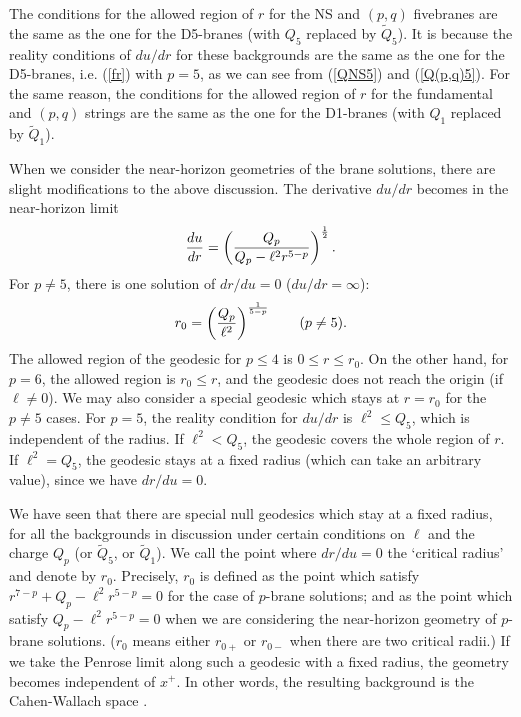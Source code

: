\documentclass[a4paper,12pt]{article}
\begin{document}
The conditions for the allowed region of $r$ for
the NS and $(p,q)$ fivebranes are the same as 
the one for the D5-branes (with $Q_5$ replaced
by $\tilde{Q}_{5}$). It is because the reality conditions
of $du/dr$ for these backgrounds
are the same as the one for the D5-branes,
i.e. (\ref{fr}) with $p=5$, as we can see from 
(\ref{QNS5}) and (\ref{Q(p,q)5}).
For the same reason, the conditions for the allowed
region of $r$ for the fundamental and $(p,q)$ strings
are the same as the one for the D1-branes (with
$Q_1$ replaced by $\tilde{Q}_{1}$).

When we consider the near-horizon geometries of
the brane solutions, there are slight modifications
to the above discussion.
The derivative $du/dr$ becomes in the near-horizon
limit 
\[
 {du\over dr}=\left(Q_{p}\over Q_{p}-\ell^2 r^{5-p}\right)^{1\over2}.
\]
For $p\neq 5$, there is one solution of
$dr/du=0$ ($du/dr=\infty$):
\begin{equation}
r_0=\left({Q_{p}\over\ell^2}\right)^{1\over 5-p} \qquad (p\ne 5).
\label{eq:nhr0}
\end{equation}
The allowed region of the geodesic for $p\le 4$
is $0\le r \le r_0$. 
On the other hand, for $p=6$, the allowed region
is $r_0\le r$, and the geodesic does not reach the origin
(if $\ell\neq 0$). 
We may also consider a special geodesic which stays
at $r=r_0$ for the $p\neq 5$ cases.
For $p=5$, the reality condition for $du/dr$ 
is $\ell^2\le Q_5$, which is independent of the radius.
If $\ell^2 < Q_5$, the geodesic covers the whole 
region of $r$. If $\ell^2=Q_{5}$, the geodesic
stays at a fixed radius (which can take an arbitrary 
value), since we have $dr/du=0$. 


We have seen that there are special null geodesics which stay
at a fixed radius, for all the backgrounds in discussion
under certain conditions on $\ell$ and the charge $Q_{p}$
(or $\tilde{Q}_{5}$, or $\tilde{Q}_{1}$). 
We call the point where $dr/du=0$ 
the `critical radius' and denote by $r_0$. 
Precisely, $r_{0}$ is defined as
the point which satisfy
$r^{7-p}+Q_{p}-\ell^{2} r^{5-p}=0$
for the case of $p$-brane solutions; 
and as the point which satisfy
$Q_{p}-\ell^{2} r^{5-p}=0$ when we are considering
the near-horizon geometry of $p$-brane solutions.
($r_0$ means either $r_{0+}$ or $r_{0-}$ when 
there are two critical radii.)
If we take the Penrose limit along such a 
geodesic with a fixed radius,
the geometry becomes independent of $x^+$.
In other words, the resulting background
is the Cahen-Wallach space \cite{CaWa}.
\end{document}
